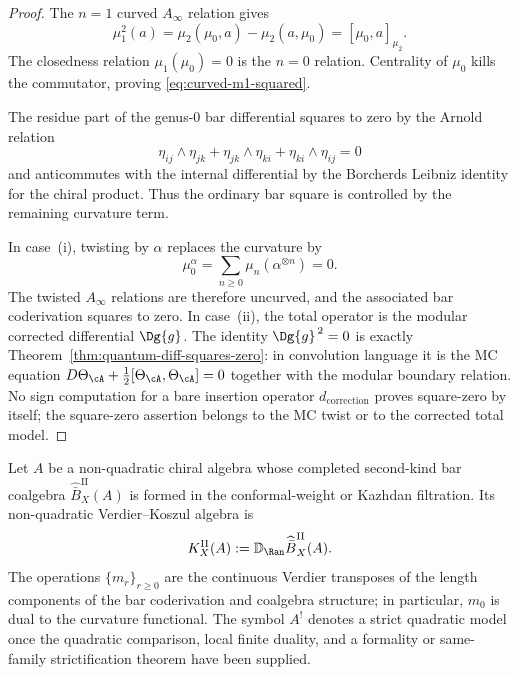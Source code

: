 \begin{proof}
The $n=1$ curved $A_\infty$ relation gives
\[
\mu_1^2(a)=\mu_2(\mu_0,a)-\mu_2(a,\mu_0)
=[\mu_0,a]_{\mu_2}.
\]
The closedness relation $\mu_1(\mu_0)=0$ is the $n=0$ relation.
Centrality of $\mu_0$ kills the commutator, proving
\eqref{eq:curved-m1-squared}.

The residue part of the genus-$0$ bar differential squares to zero by
the Arnold relation
\[
\eta_{ij}\wedge\eta_{jk}
+\eta_{jk}\wedge\eta_{ki}
+\eta_{ki}\wedge\eta_{ij}=0
\]
and anticommutes with the internal differential by the Borcherds
Leibniz identity for the chiral product. Thus the ordinary bar square
is controlled by the remaining curvature term.

In case~\textup{(i)}, twisting by $\alpha$ replaces the curvature by
\[
\mu_0^\alpha=\sum_{n\ge0}\mu_n(\alpha^{\otimes n})=0.
\]
The twisted $A_\infty$ relations are therefore uncurved, and the
associated bar coderivation squares to zero. In case~\textup{(ii)},
the total operator is the modular corrected differential $\Dg{g}$.
The identity $\Dg{g}^{\,2}=0$ is exactly
Theorem~\ref{thm:quantum-diff-squares-zero}: in convolution language it
is the MC equation
$D\Theta_\cA+\tfrac12[\Theta_\cA,\Theta_\cA]=0$ together with the
modular boundary relation. No sign computation for a bare insertion
operator $d_{\mathrm{correction}}$ proves square-zero by itself; the
square-zero assertion belongs to the MC twist or to the corrected total
model.
\end{proof}

\begin{definition}
\label{def:nonquadratic-curved-verdier-koszul-dual}
Let \(A\) be a non-quadratic chiral algebra whose completed
second-kind bar coalgebra
\(\widehat{\bar B}^{\mathrm{II}}_X(A)\) is formed in the
conformal-weight or Kazhdan filtration.  Its non-quadratic
Verdier--Koszul algebra is
\[
K_X^{\mathrm{II}}(A)
:=
\mathbb D_{\Ran}\widehat{\bar B}^{\mathrm{II}}_X(A).
\]
The operations \(\{m_r\}_{r\ge0}\) are the continuous Verdier
transposes of the length components of the bar coderivation and
coalgebra structure; in particular, \(m_0\) is dual to the curvature
functional.  The symbol \(A^!\) denotes a strict quadratic model once
the quadratic comparison, local finite duality, and a formality or
same-family strictification theorem have been supplied.
\end{definition}

